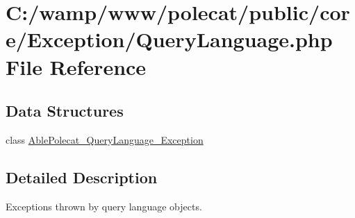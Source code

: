 \hypertarget{_exception_2_query_language_8php}{}\section{C\+:/wamp/www/polecat/public/core/\+Exception/\+Query\+Language.php File Reference}
\label{_exception_2_query_language_8php}
\subsection*{Data Structures}
\begin{DoxyCompactItemize}
\item 
class \hyperlink{class_able_polecat___query_language___exception}{Able\+Polecat\+\_\+\+Query\+Language\+\_\+\+Exception}
\end{DoxyCompactItemize}


\subsection{Detailed Description}
Exceptions thrown by query language objects. 